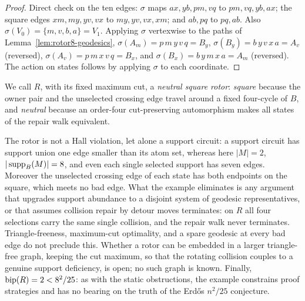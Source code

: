 \begin{proof}
Direct check on the ten edges:
\(\sigma\) maps
\(ax,yb,pm,vq\) to \(pm,vq,yb,ax\);
the square edges \(xm,my,yv,vx\) to \(my,yv,vx,xm\);
and \(ab,pq\) to \(pq,ab\). Also
\(\sigma(V_0)=\{m,v,b,a\}=V_1\). Applying \(\sigma\) vertexwise to the
paths of Lemma~\ref{lem:rotor8-geodesics},
\(\sigma(A_m)=p\,m\,y\,v\,q=B_y\),
\(\sigma(B_y)=b\,y\,v\,x\,a=A_v\) (reversed),
\(\sigma(A_v)=p\,m\,x\,v\,q=B_x\), and
\(\sigma(B_x)=b\,y\,m\,x\,a=A_m\) (reversed). The action on states
follows by applying \(\sigma\) to each coordinate.
\end{proof}

We call \(R\), with its fixed maximum cut, a \emph{neutral square
rotor}: \emph{square} because the owner pair and the unselected
crossing edge travel around a fixed four-cycle of \(B\), and
\emph{neutral} because an order-four cut-preserving automorphism makes
all states of the repair walk equivalent.

\begin{remark}\label{rem:rotor8-scope}
The rotor is not a Hall violation, let alone a support circuit: a
support circuit has support union one edge smaller than its atom set,
whereas here \(|M|=2\), \(|\operatorname{supp}_B(M)|=8\), and even each single
selected support has seven edges. Moreover the unselected crossing edge
of each state has both endpoints on the square, which meets no bad
edge. What the example eliminates is any argument that upgrades support
abundance to a disjoint system of geodesic representatives, or that
assumes collision repair by detour moves terminates: on \(R\) all four
selections carry the same single collision, and the repair walk never
terminates. Triangle-freeness, maximum-cut optimality, and a
spare geodesic at every bad edge do not preclude this. Whether a rotor
can be embedded in a larger triangle-free graph, keeping the cut
maximum, so that the rotating collision couples to a genuine support
deficiency, is open; no such graph is known. Finally,
\(\operatorname{bip}(R)=2<8^2/25\): as with the static obstructions, the example
constrains proof strategies and has no bearing on the truth of the
Erd\H{o}s \(n^2/25\) conjecture.
\end{remark}

